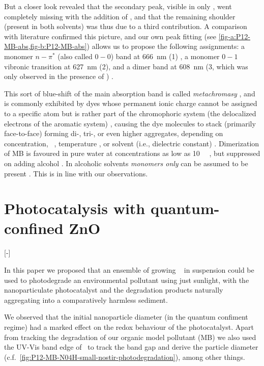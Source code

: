 \documentclass[draft,webedition,openright,titles,swedish,english]{LuaUUThesis}\usepackage[]{graphicx}\usepackage[]{xcolor}
\newcommand{\ie}{i.e.}
\newcommand{\cf}{c.f.}
\begin{document}
But a closer look revealed that the secondary peak, visible in only \water, went
completely missing with the addition of \EtOH, and that the remaining shoulder
(present in both solvents) was thus due to a third contribution.
A comparison with literature confirmed this picture, and our own peak fitting
(see \cref{fig-a:P12-MB-abs,fig-b:P12-MB-abs}) allows us to propose the following
assignments:
a monomer $n-\pi^\ast$ (also called $0-0$) band at \qty{666}{\nm} (\textsf{1}) \cite{Bergmann1963,Cenens1988},
a monomer $0-1$ vibronic transition at \qty{627}{\nm} (\textsf{2}), and
a dimer band at \qty{608}{\nm} (\textsf{3}, which was only observed
in the presence of \EtOH) \cite{Ruprecht1984}.

This sort of blue-shift of the main absorption band is called \emph{metachromasy} \cite{Cenens1988},
and is commonly exhibited by dyes whose permanent ionic charge cannot be assigned
to a specific atom but is rather part of the
chromophoric system (the delocalized electrons of the aromatic system) \cite{Schubert1955},
causing the dye molecules to stack (primarily face-to-face) forming di-, tri-, or
even higher aggregates, depending on concentration, \pH\ \cite{Singhal1967}, temperature \cite{Heger2005},
or solvent (\ie, dielectric constant) \cite{Schubert1955,Lewis1943,Braswell1968,Bergmann1963,Ruprecht1984,Fornili1981,Mahmood2013}.
Dimerization of \Gls{MB} is favoured in pure water at concentrations as
low as \qty{10}{\micro\Molar} \cite{Cenens1988}, but suppressed on adding alcohol \cite{Blandamer1967}.
In alcoholic solvents \emph{monomers only} can be assumed to be present \cite{Fornili1981,West1965,Blandamer1967}.
This is in line with our observations.



% 

\section{Photocatalysis with quantum-confined ZnO}
\label{results:P12-ZnO-QDs-PC}
[-\baselineskip]

In this paper we proposed that an ensemble of growing \ZnO\  in suspension could be
used to photodegrade an environmental pollutant using just sunlight, with
the nanoparticulate photocatalyst and the degradation products naturally aggregating
into a comparatively harmless sediment.

We observed that the initial nanoparticle diameter (in the quantum confiment regime)
had a marked effect on the redox behaviour of the photocatalyst. Apart from tracking
the degradation of our organic model pollutant (\gls{MB}) we also used the \gls{UV-Vis}
band edge of \ZnO\ to track the band gap and derive the particle diameter
(\cf\ \cref{fig:P12-MB-N04H-small-nostir-photodegradation}), among other things.
\end{document}
